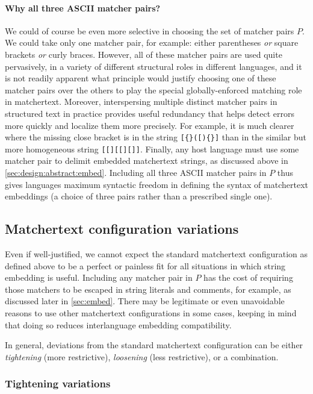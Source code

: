 \paragraph{Why all three ASCII matcher pairs?}

We could of course be even more selective
in choosing the set of matcher pairs $P$.
We could take only one matcher pair, for example:
either parentheses \emph{or} square brackets \emph{or} curly braces.
However, all of these matcher pairs are used quite pervasively,
in a variety of different structural roles in different languages,
and it is not readily apparent what principle would justify
choosing one of these matcher pairs over the others
to play the special globally-enforced matching role in matchertext.
Moreover, interspersing multiple distinct matcher pairs in structured text
in practice provides useful redundancy
that helps detect errors more quickly and localize them more precisely.
For example, it is much clearer where the missing close bracket is
in the string \verb|[{}([){}]|
than in the similar but more homogeneous string \verb|[[][[][]]|.
Finally,
any host language must use some matcher pair
to delimit embedded matchertext strings,
as discussed above in \cref{sec:design:abstract:embed}.
Including all three ASCII matcher pairs in $P$
thus gives languages maximum syntactic freedom
in defining the syntax of matchertext embeddings
(\ie a choice of three pairs rather than a prescribed single one).


\subsection{Matchertext configuration variations}

Even if well-justified,
we cannot expect the standard matchertext configuration
as defined above to be a perfect or painless fit
for all situations in which string embedding is useful.
Including any matcher pair in $P$ has the cost
of requiring those matchers to be escaped
in string literals and comments, for example,
as discussed later in \cref{sec:embed}.
There may be legitimate or even unavoidable reasons
to use other matchertext configurations in some cases,
keeping in mind that doing so reduces interlanguage embedding compatibility.

In general, deviations from the standard matchertext configuration
can be either \emph{tightening} (more restrictive),
\emph{loosening} (less restrictive), or a combination.

\subsubsection{Tightening variations}

